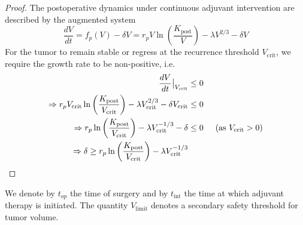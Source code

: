 \documentclass[11pt, reqno]{amsart}
\numberwithin{equation}{section}
\theoremstyle{definition}
\begin{document}
\begin{proof}
The postoperative dynamics under continuous adjuvant intervention are described by the augmented system
\[ \frac{dV}{dt} = f_p(V) - \delta V = r_p V \ln\left(\frac{K_{\text{post}}}{V}\right) - \lambda V^{2/3} - \delta V \]
For the tumor to remain stable or regress at the recurrence threshold $V_{\text{crit}}$, we require the growth rate to be non-positive, i.e. 
\begin{align*}
\frac{dV}{dt} \big|_{V_{\text{crit}}} &\leq 0 \\
\Rightarrow r_p V_{\text{crit}} \ln\left(\frac{K_{\text{post}}}{V_{\text{crit}}}\right) - \lambda V_{\text{crit}}^{2/3} - \delta V_{\text{crit}} &\leq 0\\
\Rightarrow r_p \ln\left(\frac{K_{\text{post}}}{V_{\text{crit}}}\right) - \lambda V_{\text{crit}}^{-1/3} - \delta &\leq 0 \hspace{0.5cm} (\text{as } V_{\text{crit}} > 0)\\
\Rightarrow \delta \geq r_p \ln\left(\frac{K_{\text{post}}}{V_{\text{crit}}}\right) - \lambda V_{\text{crit}}^{-1/3}
\end{align*}

\end{proof}

We denote by $t_{op}$ the time of surgery and by $t_{\mathrm{int}}$ the time at which adjuvant therapy is initiated. The quantity $V_{\mathrm{limit}}$ denotes a secondary safety threshold for tumor volume.
\end{document}

